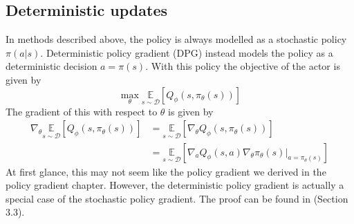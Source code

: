 

\subsection{Deterministic updates}
In methods described above, the policy is always modelled as a stochastic policy $\pi(a|s)$. 
Deterministic policy gradient (DPG) instead models the policy as a deterministic decision $a = \pi(s)$.
With this policy the objective of the actor is given by 
$$\max\limits_\theta \underset{s\sim \mathcal{D}}{\mathbb{E}}[Q_\phi(s,\pi_\theta(s))]$$
The gradient of this with respect to $\theta$ is given by
\begin{align*}
\nabla_\theta  \underset{s\sim \mathcal{D}}{\mathbb{E}}[Q_\phi(s,\pi_\theta(s))]
&=  \underset{s\sim \mathcal{D}}{\mathbb{E}}[\nabla_\theta Q_\phi(s,\pi_\theta(s))] \\
&=  \underset{s\sim \mathcal{D}}{\mathbb{E}}\left[ \nabla_a Q_\phi(s,a) \nabla_\theta \pi_\theta(s)|_{a=\pi_\theta(s)}\right]
\end{align*}
At first glance, this may not seem like the policy gradient we derived in the policy gradient chapter. 
However, the deterministic policy gradient is actually a special case of the stochastic policy gradient. 
The proof can be found in \cite{10.5555/3044805.3044850}(Section 3.3).


